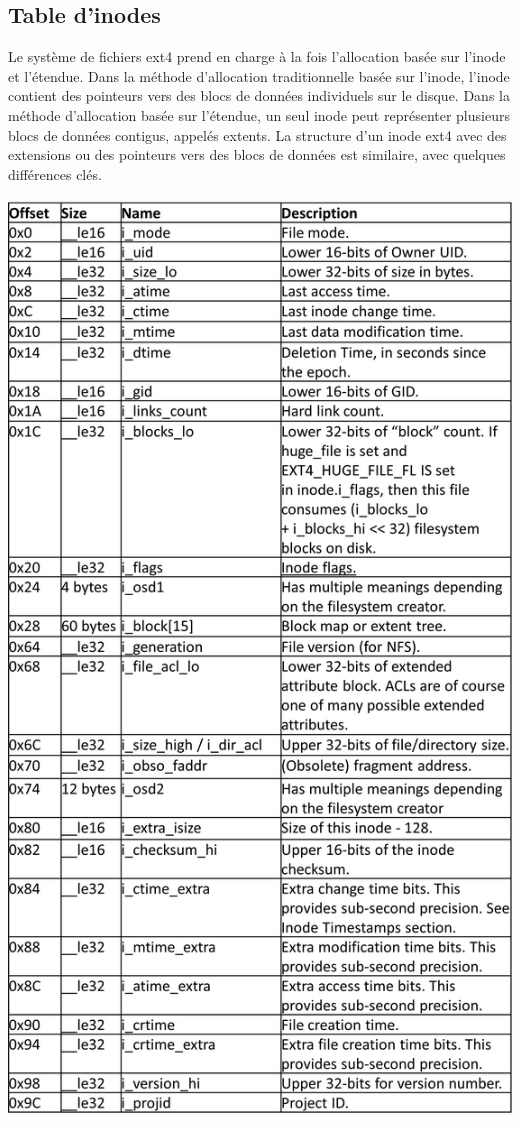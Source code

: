 \documentclass[12pt, letterpaper]{report}
\begin{document}
\subsection{Table d’inodes}
Le système de fichiers ext4 prend en charge à la fois l'allocation basée sur l'inode et l'étendue. Dans la méthode d'allocation traditionnelle basée sur l'inode, l'inode contient des pointeurs vers des blocs de données individuels sur le disque. Dans la méthode d'allocation basée sur l'étendue, un seul inode peut représenter plusieurs blocs de données contigus, appelés extents.
La structure d'un inode ext4 avec des extensions ou des pointeurs vers des blocs de données est similaire, avec quelques différences clés.

\begin{center}
	\includegraphics[width=\textwidth]{inode}
\end{center}
\end{document}
